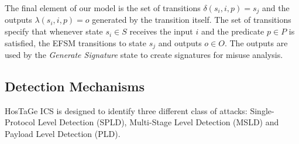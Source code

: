 \documentclass[article,msc=informatik,type=msc,colorback,accentcolor=tud9c]{tudthesis}
\begin{document}
	\vspace{3mm}
	The final element of our model is the set of transitions $\delta(s_i ,i, p) = s_j$ and the outputs $\lambda(s_i , i, p) = o$ generated by the transition itself. The set of transitions specify that whenever state $s_i \in S$ receives the input $i$ and the predicate $p \in P$ is satisfied, the
	\ac{EFSM} transitions to state $s_j$ and outputs $o \in O$. The outputs are used by the \textit{Generate Signature} state to create signatures for misuse analysis.



	\vspace{5mm} 
	\subsection{Detection Mechanisms}\label{Detection Mechanisms}
	HosTaGe ICS is designed to identify three different class of attacks: Single-Protocol Level Detection (SPLD), Multi-Stage Level Detection (MSLD) and Payload Level Detection (PLD). 
  
\end{document}

